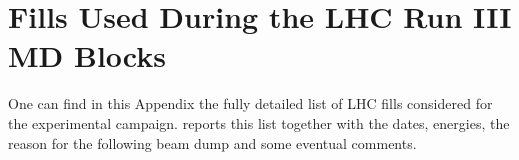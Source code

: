 

 \section{Fills Used During the LHC Run III MD Blocks}

 One can find in this Appendix the fully detailed list of LHC fills considered for the experimental campaign.
 reports this list together with the dates, energies, the reason for the following beam dump and some eventual comments. 
 
